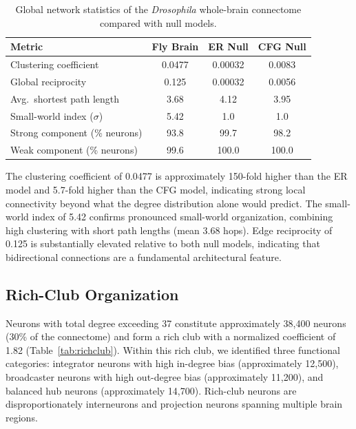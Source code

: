 \documentclass[11pt]{article}
\begin{document}
\begin{table}[ht]
\centering
\caption{Global network statistics of the \textit{Drosophila} whole-brain connectome compared with null models.}
\label{tab:global}
\begin{tabular}{@{}lccc@{}}
\toprule
Metric & Fly Brain & ER Null & CFG Null \\
\midrule
Clustering coefficient & 0.0477 & 0.00032 & 0.0083 \\
Global reciprocity & 0.125 & 0.00032 & 0.0056 \\
Avg.\ shortest path length & 3.68 & 4.12 & 3.95 \\
Small-world index ($\sigma$) & 5.42 & 1.0 & 1.0 \\
Strong component (\% neurons) & 93.8 & 99.7 & 98.2 \\
Weak component (\% neurons) & 99.6 & 100.0 & 100.0 \\
\bottomrule
\end{tabular}
\end{table}

The clustering coefficient of 0.0477 is approximately 150-fold higher than the ER model and 5.7-fold higher than the CFG model, indicating strong local connectivity beyond what the degree distribution alone would predict. The small-world index of 5.42 confirms pronounced small-world organization, combining high clustering with short path lengths (mean 3.68 hops). Edge reciprocity of 0.125 is substantially elevated relative to both null models, indicating that bidirectional connections are a fundamental architectural feature.

\subsection{Rich-Club Organization}

Neurons with total degree exceeding 37 constitute approximately 38,400 neurons (30\% of the connectome) and form a rich club with a normalized coefficient of 1.82 (Table~\ref{tab:richclub}). Within this rich club, we identified three functional categories: integrator neurons with high in-degree bias (approximately 12,500), broadcaster neurons with high out-degree bias (approximately 11,200), and balanced hub neurons (approximately 14,700). Rich-club neurons are disproportionately interneurons and projection neurons spanning multiple brain regions.
\end{document}
